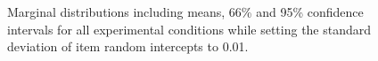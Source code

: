 \documentclass[
  man,
  floatsintext,
  longtable,
  a4paper,
  nolmodern,
  notxfonts,
  notimes,
  colorlinks=true,linkcolor=blue,citecolor=blue,urlcolor=blue]{apa7}
\begin{document}
\label{cell-fig-margdist2}
\begin{figure}[H]

\caption{\label{fig-margdist2}Marginal distributions including means,
66\% and 95\% confidence intervals for all experimental conditions while
setting the standard deviation of item random intercepts to 0.01.}


\end{figure}%
\end{document}
